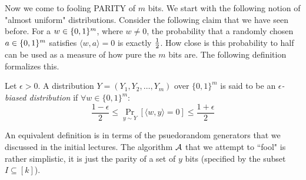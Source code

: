 
Now we come to fooling {\sc PARITY} of $m$ bits. We start with the following notion of "almost uniform" distributions. Consider the following claim that we have seen before. For a $w \in \{0,1\}^m$, where $w \ne 0$, the probability that a randomly chosen $a \in \{0,1\}^m$ satisfies $\langle
w,a \rangle = 0$ is exactly $\frac{1}{2}$. How close is this probability to half can be used as a measure of how pure the $m$ bits are. The following definition formalizes this.
\begin{definition}
Let $\epsilon > 0$. A distribution $Y = (Y_1,Y_2, \ldots, Y_m)$ over $\{0,1\}^m$ is said to be an \textit{$\epsilon$-biased distribution }if $\forall w \in \{0,1\}^m$:
$$\frac{1-\epsilon}{2} \le \Pr_{y \sim Y}\left[ \langle w,y \rangle = 0 \right] \le \frac{1+\epsilon}{2}$$
\end{definition}
\noindent An equivalent definition is in terms of the psuedorandom generators that we discussed in the initial lectures. The algorithm ${\cal A}$ that we attempt to ``fool" is rather simplistic, it is just the parity of a set of $y$ bits (specified by the subset $I \subseteq [k]$). 

